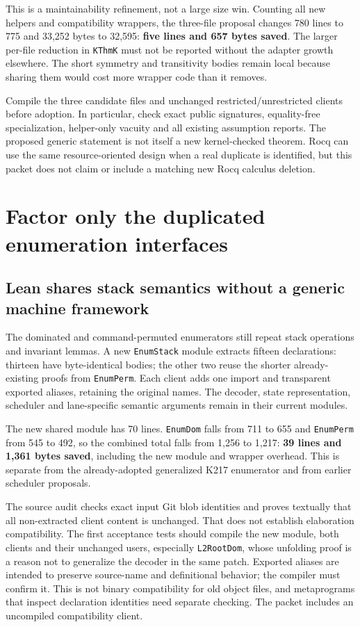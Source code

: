 \documentclass[11pt]{article}
\newcommand{\code}[1]{\texttt{#1}}
\begin{document}
This is a maintainability refinement, not a large size win. Counting all new helpers and compatibility wrappers, the three-file proposal changes 780 lines to 775 and 33,252 bytes to 32,595: \textbf{five lines and 657 bytes saved}. The larger per-file reduction in \code{KThmK} must not be reported without the adapter growth elsewhere. The short symmetry and transitivity bodies remain local because sharing them would cost more wrapper code than it removes.

Compile the three candidate files and unchanged restricted/unrestricted clients before adoption. In particular, check exact public signatures, equality-free specialization, helper-only vacuity and all existing assumption reports. The proposed generic statement is not itself a new kernel-checked theorem. Rocq can use the same resource-oriented design when a real duplicate is identified, but this packet does not claim or include a matching new Rocq calculus deletion.

\section{Factor only the duplicated enumeration interfaces}
\subsection{Lean shares stack semantics without a generic machine framework}
The dominated and command-permuted enumerators still repeat stack operations and invariant lemmas. A new \code{EnumStack} module extracts fifteen declarations: thirteen have byte-identical bodies; the other two reuse the shorter already-existing proofs from \code{EnumPerm}. Each client adds one import and transparent exported aliases, retaining the original names. The decoder, state representation, scheduler and lane-specific semantic arguments remain in their current modules.

The new shared module has 70 lines. \code{EnumDom} falls from 711 to 655 and \code{EnumPerm} from 545 to 492, so the combined total falls from 1,256 to 1,217: \textbf{39 lines and 1,361 bytes saved}, including the new module and wrapper overhead. This is separate from the already-adopted generalized K217 enumerator and from earlier scheduler proposals.

The source audit checks exact input Git blob identities and proves textually that all non-extracted client content is unchanged. That does not establish elaboration compatibility. The first acceptance tests should compile the new module, both clients and their unchanged users, especially \code{L2RootDom}, whose unfolding proof is a reason not to generalize the decoder in the same patch. Exported aliases are intended to preserve source-name and definitional behavior; the compiler must confirm it. This is not binary compatibility for old object files, and metaprograms that inspect declaration identities need separate checking. The packet includes an uncompiled compatibility client.
\end{document}
